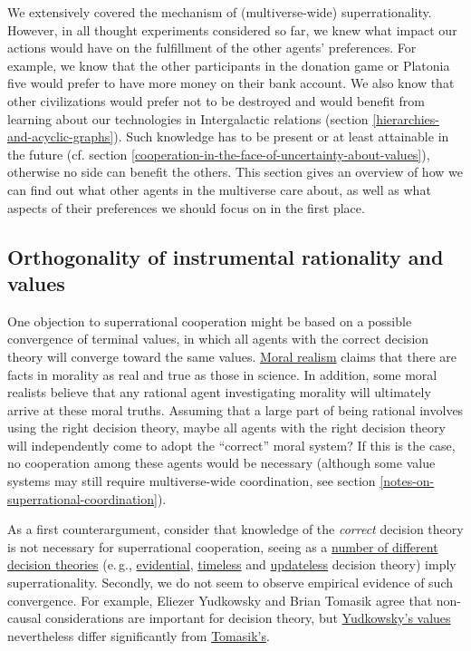 We extensively covered the mechanism of (multiverse-wide)
superrationality. However, in all thought experiments considered so far,
we knew what impact our actions would have on the fulfillment of the
other agents' preferences. For example, we know that the other
participants in the donation game or Platonia five would prefer to have
more money on their bank account. We also know that other civilizations
would prefer not to be destroyed and would benefit from learning about our technologies in Intergalactic relations (section
\ref{hierarchies-and-acyclic-graphs}). Such
knowledge has to be present or at least attainable in the future (cf.
section
\ref{cooperation-in-the-face-of-uncertainty-about-values}),
otherwise no side can benefit the others. This section gives an overview
of how we can find out what other agents in the multiverse care about,
as well as what aspects of their preferences we should focus on in the
first place.

\hypertarget{orthogonality-of-instrumental-rationality-and-values}{\subsection{Orthogonality
of instrumental rationality and
values}\label{orthogonality-of-instrumental-rationality-and-values}}

One objection to superrational cooperation might be based on a possible
convergence of terminal values, in which all agents with the correct
decision theory will converge toward the same values.
\href{https://en.wikipedia.org/wiki/Moral_realism}{Moral realism}
claims that there are facts in morality as real and true as those in
science. In addition, some moral realists believe that any rational
agent investigating morality will ultimately arrive at these moral
truths. Assuming that a large part of being rational involves using the
right decision theory, maybe all agents with the right decision theory
will independently come to adopt the ``correct'' moral system? If this
is the case, no cooperation among these agents would be necessary
(although some value systems may still require multiverse-wide
coordination,
see section
\ref{notes-on-superrational-coordination}).

As a first counterargument, consider that knowledge of the
\emph{correct} decision theory is not necessary for superrational cooperation,
seeing as a
\href{https://casparoesterheld.com/a-comprehensive-list-of-decision-theories/}{number
of different decision theories} (e.\,g.,
\href{https://en.wikipedia.org/wiki/Evidential_decision_theory}{evidential},
\href{https://intelligence.org/files/TDT.pdf}{timeless} and
\href{https://wiki.lesswrong.com/wiki/Updateless_decision_theory}{updateless}
decision theory) imply superrationality. Secondly, we do not seem to
observe empirical evidence of such convergence. For example, Eliezer
Yudkowsky and Brian Tomasik agree that non-causal considerations are
important for decision theory, but
\href{https://wiki.lesswrong.com/wiki/Fun_theory}{Yudkowsky's
values} nevertheless differ significantly from
\href{http://reducing-suffering.org/\#Ethics}{Tomasik's}.

